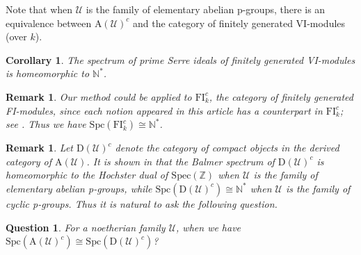 \documentclass[11pt,a4paper]{amsart}
\numberwithin{equation}{section} \theoremstyle{plain}
\newtheorem{cor}[lem]{Corollary}
\newtheorem{Quest}[lem]{Question}
\newtheorem{rem}[lem]{Remark}
\begin{document}
Note that when  $\mathcal{U}$ is the family of elementary abelian p-groups, there is an equivalence between $\mathrm{A}(\mathcal{U})^{c}$ and the category of finitely generated VI-modules (over $k$).
\begin{cor} The spectrum of prime Serre ideals of finitely generated VI-modules is homeomorphic to $\mathbb{N}^{*}$.
\end{cor}

\begin{rem}Our method could be applied to $\mathrm{FI}_{k}^{c}$, the category  of finitely generated FI-modules, since each notion appeared in this article has a counterpart in $\mathrm{FI}_{k}^{c}$; see \cite{CEFN14}. Thus we have $\mathrm{Spc}(\mathrm{FI}_{k}^{c})\cong \mathbb{N}^{*}$.
\end{rem}

\begin{rem}Let $\mathrm{D}(\mathcal{U})^{c}$ denote the category of compact objects in the derived category of $\mathrm{A}(\mathcal{U})$. It is shown in \cite[Theorem 6.13, Example 12.10]{BBP+25b} that the Balmer spectrum of $\mathrm{D}(\mathcal{U})^{c}$ is homeomorphic to the Hochster dual of $\mathrm{Spec}(\mathbb{Z})$ when $\mathcal{U}$ is the family of elementary abelian p-groups, while $\mathrm{Spc}(\mathrm{D}(\mathcal{U})^{c})\cong \mathbb{N}^{*}$ when $\mathcal{U}$ is the family of cyclic p-groups. Thus it is natural to ask the following question.
\end{rem}

\begin{Quest}For a noetherian family $\mathcal{U}$, when we have $\mathrm{Spc}(\mathrm{A}(\mathcal{U})^{c})\cong \mathrm{Spc}(\mathrm{D}(\mathcal{U})^{c})$?
\end{Quest}
\end{document}
